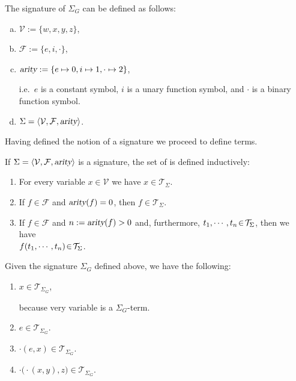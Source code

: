 \example
The signature of  $\Sigma_G$ can be defined as follows:
\begin{enumerate}[(a)]
\item $\mathcal{V} := \{ w, x, y, z \}$,
\item $\mathcal{F} := \{ e, i, \cdot \}$,
\item $\textsl{arity} := \{ e \mapsto 0, i \mapsto 1, \cdot \mapsto 2 \}$,
  
      i.e.~$e$ is a constant symbol, $i$ is a unary function symbol, and $\cdot$ is a binary function symbol.
\item $\Sigma = \langle \mathcal{V}, \mathcal{F}, \textsl{arity} \rangle$. \eoxs
\end{enumerate}

\noindent
Having defined the notion of a signature we proceed to define terms.

\begin{Definition}
  If $\Sigma = \langle \mathcal{V}, \mathcal{F}, \textsl{arity} \rangle$ is a signature, the set of
     
   is defined inductively:
  \begin{enumerate}
  \item For every variable $x \in \mathcal{V}$ we have $x \in \mathcal{T}_\Sigma$.
  \item If $f \in \mathcal{F}$ and $\textsl{arity}(f) = 0$, then $f \in \mathcal{T}_\Sigma$.
  \item If $f \in \mathcal{F}$ and $n := \textsl{arity}(f) > 0$ and, furthermore, $t_1,\cdots,t_n \!\in\! \mathcal{T}_\Sigma$,  then we have
        \\[0.2cm]
        \hspace*{1.3cm} $f(t_1,\cdots,t_n) \!\in\! \mathcal{T}_\Sigma$.
        \eoxs
  \end{enumerate}
\end{Definition}

\example
Given the signature $\Sigma_G$ defined above, we have the following:
\begin{enumerate}
\item $x \in \mathcal{T}_{\Sigma_G}$,
  
      because very variable is a $\Sigma_{G}$-term.
\item $e \in \mathcal{T}_{\Sigma_G}$.
\item $\cdot(e,x) \in \mathcal{T}_{\Sigma_G}$.
\item $\cdot\bigl(\cdot(x,y),z\bigr) \in \mathcal{T}_{\Sigma_G}$.
\end{enumerate}

